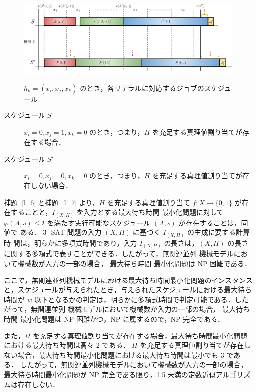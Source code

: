 \documentclass[12pt]{optlab-bachelor}
\begin{document}
\begin{figure}[h]
  \centering
  \includegraphics[width = 16cm]{figure/3SAT2.pdf}\\
  \caption{$h_k = (x_i, x_j, x_k)$ のとき，各リテラルに対応するジョブのスケジュール}
\end{figure}

\begin{description}
  \item[スケジュール $S$ ] $x_i = 0, x_j = 1, x_k = 0$ のとき，つまり，$H$ を充足する真理値割り当てが存在する場合．
  \item[スケジュール $S'$ ] $x_i = 0, x_j = 0, x_k = 0$ のとき，つまり，$H$ を充足する真理値割り当てが存在しない場合．
\end{description}

補題~\ref{l_6} と補題~\ref{l_7} より，$H$ を充足する真理値割り当て $f : X \to \{0,
1\}$ が存在することと，$I_{(X,H)}$ を入力とする最大待ち時間
最小化問題に対して $\varphi(A,s) \le 2$
を満たす実行可能なスケジュール $(A,s)$ が存在することは，同値で
ある．
3 -SAT 問題の入力 $(X,H)$ に基づく $I_{(X,H)}$ の生成に要する計算時
間は，明らかに多項式時間であり，入力 $I_{(X,H)}$ の長さは，$(X, H)$
の長さに関する多項式で表すことができる．したがって，無関連並列
機械モデルにおいて機械数が入力の一部の場合， 最大待ち時間
最小化問題は NP 困難である．

ここで，無関連並列機械モデルにおける最大待ち時間最小化問題のインスタンスと，スケジュールが与えられたとき，与えられたスケジュールにおける最大待ち時間が $w$ 以下となるかの判定は，明らかに多項式時間で判定可能である．したがって，無関連並列
機械モデルにおいて機械数が入力の一部の場合， 最大待ち時間
最小化問題は NP 困難かつ，NP に属するので，NP 完全である．

また，$H$ を充足する真理値割り当てが存在する場合，最大待ち時間最小化問題における最大待ち時間は高々 2 である．
$H$ を充足する真理値割り当てが存在しない場合，最大待ち時間最小化問題における最大待ち時間は最小でも 3 である．
したがって，無関連並列機械モデルにおいて機械数が入力の一部の場合，最大待ち時間最小化問題が NP 完全である限り，1.5 未満の定数近似アルゴリズムは存在しない．
\end{document}
